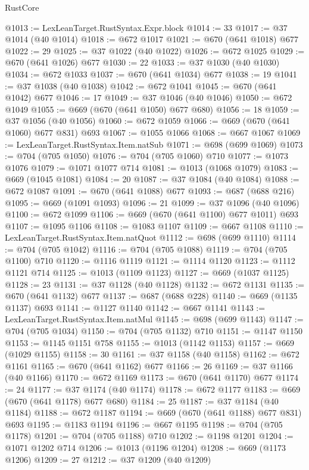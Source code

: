 \begin{lexlean}{RustCore}
\begin{coremodule}
@1013 := LexLeanTarget.RustSyntax.Expr.block
@1014 := 33
@1017 := @37 @1014 (@40 @1014)
@1018 := @672 @1017
@1021 := @670 (@641 @1018) @677
@1022 := 29
@1025 := @37 @1022 (@40 @1022)
@1026 := @672 @1025
@1029 := @670 (@641 @1026) @677
@1030 := 22
@1033 := @37 @1030 (@40 @1030)
@1034 := @672 @1033
@1037 := @670 (@641 @1034) @677
@1038 := 19
@1041 := @37 @1038 (@40 @1038)
@1042 := @672 @1041
@1045 := @670 (@641 @1042) @677
@1046 := 17
@1049 := @37 @1046 (@40 @1046)
@1050 := @672 @1049
@1055 := @669 (@670 (@641 @1050) @677 @680)
@1056 := 18
@1059 := @37 @1056 (@40 @1056)
@1060 := @672 @1059
@1066 := @669 (@670 (@641 @1060) @677 @831) @693
@1067 := @1055 @1066
@1068 := @667 @1067
@1069 := LexLeanTarget.RustSyntax.Item.natSub
@1071 := @698 (@699 @1069)
@1073 := @704 (@705 @1050)
@1076 := @704 (@705 @1060) @710
@1077 := @1073 @1076
@1079 := @1071 @1077 @714
@1081 := @1013 (@1068 @1079)
@1083 := @669 (@1045 @1081)
@1084 := 20
@1087 := @37 @1084 (@40 @1084)
@1088 := @672 @1087
@1091 := @670 (@641 @1088) @677
@1093 := @687 (@688 @216)
@1095 := @669 (@1091 @1093)
@1096 := 21
@1099 := @37 @1096 (@40 @1096)
@1100 := @672 @1099
@1106 := @669 (@670 (@641 @1100) @677 @1011) @693
@1107 := @1095 @1106
@1108 := @1083 @1107
@1109 := @667 @1108
@1110 := LexLeanTarget.RustSyntax.Item.natQuot
@1112 := @698 (@699 @1110)
@1114 := @704 (@705 @1042)
@1116 := @704 (@705 @1088)
@1119 := @704 (@705 @1100) @710
@1120 := @1116 @1119
@1121 := @1114 @1120
@1123 := @1112 @1121 @714
@1125 := @1013 (@1109 @1123)
@1127 := @669 (@1037 @1125)
@1128 := 23
@1131 := @37 @1128 (@40 @1128)
@1132 := @672 @1131
@1135 := @670 (@641 @1132) @677
@1137 := @687 (@688 @228)
@1140 := @669 (@1135 @1137) @693
@1141 := @1127 @1140
@1142 := @667 @1141
@1143 := LexLeanTarget.RustSyntax.Item.natMul
@1145 := @698 (@699 @1143)
@1147 := @704 (@705 @1034)
@1150 := @704 (@705 @1132) @710
@1151 := @1147 @1150
@1153 := @1145 @1151 @758
@1155 := @1013 (@1142 @1153)
@1157 := @669 (@1029 @1155)
@1158 := 30
@1161 := @37 @1158 (@40 @1158)
@1162 := @672 @1161
@1165 := @670 (@641 @1162) @677
@1166 := 26
@1169 := @37 @1166 (@40 @1166)
@1170 := @672 @1169
@1173 := @670 (@641 @1170) @677
@1174 := 24
@1177 := @37 @1174 (@40 @1174)
@1178 := @672 @1177
@1183 := @669 (@670 (@641 @1178) @677 @680)
@1184 := 25
@1187 := @37 @1184 (@40 @1184)
@1188 := @672 @1187
@1194 := @669 (@670 (@641 @1188) @677 @831) @693
@1195 := @1183 @1194
@1196 := @667 @1195
@1198 := @704 (@705 @1178)
@1201 := @704 (@705 @1188) @710
@1202 := @1198 @1201
@1204 := @1071 @1202 @714
@1206 := @1013 (@1196 @1204)
@1208 := @669 (@1173 @1206)
@1209 := 27
@1212 := @37 @1209 (@40 @1209)

\end{coremodule}
\end{lexlean}
